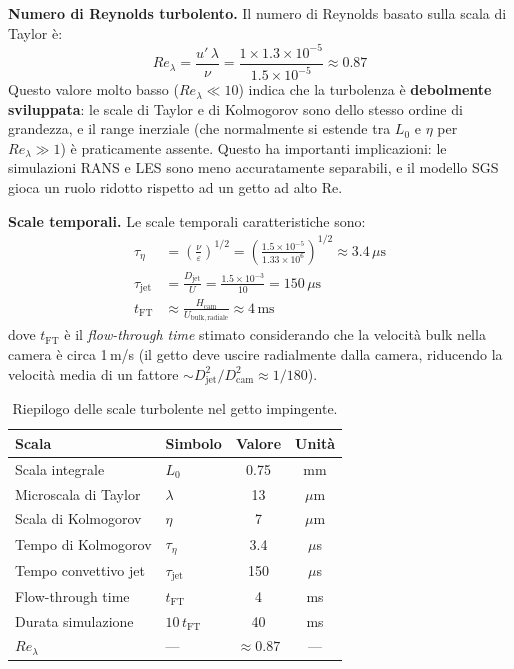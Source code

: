 \documentclass[11pt,a4paper]{article}
\newcommand{\Djet}{D_{\mathrm{jet}}}
\newcommand{\Dcam}{D_{\mathrm{cam}}}
\newcommand{\mus}{\,\mu\mathrm{s}}
\newcommand{\tFT}{t_{\mathrm{FT}}}
\begin{document}
\textbf{Numero di Reynolds turbolento.} Il numero di Reynolds basato sulla scala di Taylor è:
\begin{equation}
  Re_\lambda = \frac{u'\,\lambda}{\nu}
             = \frac{1 \times 1.3\times10^{-5}}{1.5\times10^{-5}}
             \approx 0.87
\end{equation}
Questo valore molto basso ($Re_\lambda \ll 10$) indica che la turbolenza è \textbf{debolmente sviluppata}: le scale di Taylor e di Kolmogorov sono dello stesso ordine di grandezza, e il range inerziale (che normalmente si estende tra $L_0$ e $\eta$ per $Re_\lambda \gg 1$) è praticamente assente. Questo ha importanti implicazioni: le simulazioni RANS e LES sono meno accuratamente separabili, e il modello SGS gioca un ruolo ridotto rispetto ad un getto ad alto Re.

\textbf{Scale temporali.} Le scale temporali caratteristiche sono:
\begin{align}
  \tau_\eta   &= \left(\frac{\nu}{\varepsilon}\right)^{1/2}
               = \left(\frac{1.5\times10^{-5}}{1.33\times10^6}\right)^{1/2}
               \approx 3.4\mus \\
  \tau_{\mathrm{jet}} &= \frac{\Djet}{U}
               = \frac{1.5\times10^{-3}}{10}
               = 150\mus \\
  \tFT         &\approx \frac{H_{\mathrm{cam}}}{U_{\mathrm{bulk,radiale}}}
               \approx 4\,\text{ms}
\end{align}
dove $\tFT$ è il \emph{flow-through time} stimato considerando che la velocità bulk nella camera è circa 1\,m/s (il getto deve uscire radialmente dalla camera, riducendo la velocità media di un fattore $\sim\Djet^2/\Dcam^2 \approx 1/180$).

\begin{table}[H]
  \centering
  \caption{Riepilogo delle scale turbolente nel getto impingente.}
  \label{tab:scales}
  \begin{tabular}{llcc}
    \toprule
    \rowcolor{tablehead}
    \textbf{Scala} & \textbf{Simbolo} & \textbf{Valore} & \textbf{Unità} \\
    \midrule
    Scala integrale     & $L_0$        & 0.75      & mm \\
    Microscala di Taylor & $\lambda$    & 13        & $\mu$m \\
    Scala di Kolmogorov  & $\eta$       & 7         & $\mu$m \\
    Tempo di Kolmogorov  & $\tau_\eta$  & 3.4       & $\mu$s \\
    Tempo convettivo jet & $\tau_{\mathrm{jet}}$ & 150 & $\mu$s \\
    Flow-through time   & $\tFT$       & 4         & ms \\
    Durata simulazione  & $10\,\tFT$   & 40        & ms \\
    $Re_\lambda$        & ---          & $\approx 0.87$ & --- \\
    \bottomrule
  \end{tabular}
\end{table}
\end{document}
